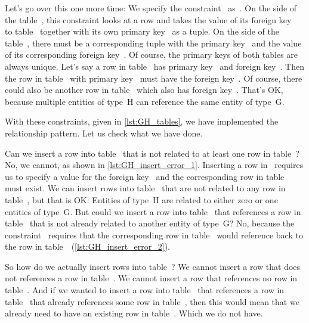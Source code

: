 \begin{sloppypar}%
Let's go over this one more time:
We specify the constraint~ as~.
On the side of the table~, this constraint looks at a row and takes the value of its foreign key~ to table~ together with its own primary key~ as a tuple.
On the side of the table~, there must be a corresponding tuple with the primary key~ and the value of its corresponding foreign key~.
Of course, the primary keys of both tables are always unique.
Let's say a row in table~ has primary key~ and foreign key~.
Then the row in table~ with primary key~ must have the foreign key~.
Of course, there could also be another row in table~ which also has foreign key~.
That's OK, because multiple entities of type~H can reference the same entity of type~G.
\end{sloppypar}%
%
With these constraints, given in \cref{lst:GH_tables}, we have implemented the relationship pattern.
Let us check what we have done.

Can we insert a row into table~ that is not related to at least one row in table~?
No, we cannot, as shown in \cref{lst:GH_insert_error_1}.
Inserting a row in~ requires us to specify a value for the foreign key~ and the corresponding row in table~ must exist.
We can insert rows into table~ that are not related to any row in table~, but that is OK:
Entities of type~H are related to either zero or one entities of type~G.
But could we insert a row into table~ that references a row in table~ that is not already related to another entity of type~G?
No, because the constraint~ requires that the corresponding row in table~ would reference back to the row in table~~(\cref{lst:GH_insert_error_2}).

So how do we actually insert rows into table~?
We cannot insert a row that does not references a row in table~.
We cannot insert a row that references no row in table~.
And if we wanted to insert a row into table~ that references a row in table~ that already references some row in table~, then this would mean that we already need to have an existing row in table~.
Which we do not have.

